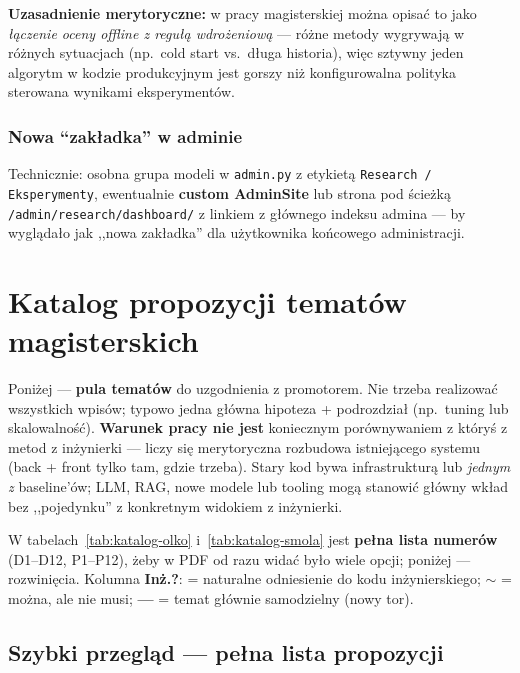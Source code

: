\documentclass[a4paper,11pt]{article}
\newcommand{\code}[1]{\texttt{\small #1}}
\begin{document}
\textbf{Uzasadnienie merytoryczne:} w pracy magisterskiej można opisać to jako \emph{łączenie oceny offline z regułą wdrożeniową} --- różne metody wygrywają w różnych sytuacjach (np.\ cold start vs.\ długa historia), więc sztywny jeden algorytm w kodzie produkcyjnym jest gorszy niż konfigurowalna polityka sterowana wynikami eksperymentów.

\subsubsection{Nowa ``zakładka'' w adminie}

Technicznie: osobna grupa modeli w \code{admin.py} z etykietą \texttt{Research / Eksperymenty}, ewentualnie \textbf{custom AdminSite} lub strona pod ścieżką \code{/admin/research/dashboard/} z linkiem z głównego indeksu admina --- by wyglądało jak ,,nowa zakładka'' dla użytkownika końcowego administracji.

\newpage
\section{Katalog propozycji tematów magisterskich}\label{sec:katalog}

\noindent Poniżej --- \textbf{pula tematów} do uzgodnienia z promotorem. Nie trzeba realizować wszystkich wpisów; typowo jedna główna hipoteza + podrozdział (np.\ tuning lub skalowalność). \textbf{Warunek pracy nie jest} koniecznym porównywaniem z któryś z metod z inżynierki --- liczy się merytoryczna rozbudowa istniejącego systemu (back + front tylko tam, gdzie trzeba). Stary kod bywa infrastrukturą lub \emph{jednym z} baseline'ów; LLM, RAG, nowe modele lub tooling mogą stanowić główny wkład bez ,,pojedynku'' z konkretnym widokiem z inżynierki.

\medskip
\noindent W tabelach~\ref{tab:katalog-olko} i~\ref{tab:katalog-smola} jest \textbf{pełna lista numerów} (D1--D12, P1--P12), żeby w PDF od razu widać było wiele opcji; poniżej --- rozwinięcia. Kolumna \textbf{Inż.?}: \checkmark{} = naturalne odniesienie do kodu inżynierskiego; \textbf{$\sim$} = można, ale nie musi; \textbf{---} = temat głównie samodzielny (nowy tor).

\subsection{Szybki przegląd --- pełna lista propozycji}\label{sec:katalog-skrót}
\end{document}
